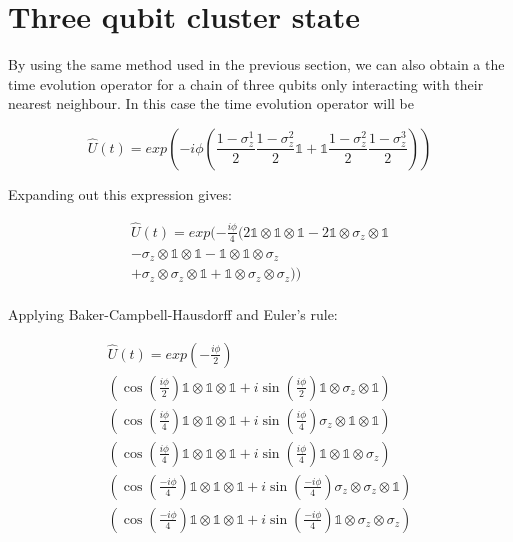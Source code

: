
\section{Three qubit cluster state}

By using the same method used in the previous section, we can also obtain a the time evolution operator for a chain of three qubits only interacting with their nearest neighbour. In this case the time evolution operator will be

\begin{equation}
\hat{U} (t) = exp\left(-i \phi \left( 
\frac{1 - \sigma^{1}_{z}}{2} \frac{1 - \sigma^{2}_{z}}{2}\mathbb{1}
+ \mathbb{1}\frac{1 - \sigma^{2}_{z}}{2} \frac{1 - \sigma^{3}_{z}}{2}
\right)\right)
\end{equation}

Expanding out this expression gives:

\begin{multline}
\hat{U} (t) = exp(-\frac{i \phi}{4}( 
2 \mathbb{1} \otimes \mathbb{1} \otimes \mathbb{1}
- 2 \mathbb{1} \otimes \sigma_{z} \otimes \mathbb{1} \\
- \sigma_{z} \otimes \mathbb{1} \otimes \mathbb{1}
- \mathbb{1} \otimes \mathbb{1} \otimes \sigma_{z} \\
+ \sigma_{z} \otimes \sigma_{z} \otimes \mathbb{1}
+ \mathbb{1} \otimes \sigma_{z} \otimes \sigma_{z} 
)) \\
\end{multline}

Applying Baker-Campbell-Hausdorff and Euler's rule:

\begin{multline*}
\hat{U} (t) = exp(-\frac{i \phi}{2}) \\
\left(\cos(\frac{i \phi}{2}) \mathbb{1} \otimes \mathbb{1} \otimes \mathbb{1}
+ i \sin (\frac{i \phi}{2}) \mathbb{1} \otimes \sigma_{z} \otimes \mathbb{1}\right) \\
\left(\cos(\frac{i \phi}{4}) \mathbb{1} \otimes \mathbb{1} \otimes \mathbb{1}
+ i \sin (\frac{i \phi}{4}) \sigma_{z} \otimes \mathbb{1} \otimes \mathbb{1}\right) \\
\left(\cos(\frac{i \phi}{4}) \mathbb{1} \otimes \mathbb{1} \otimes \mathbb{1}
+ i \sin (\frac{i \phi}{4}) \mathbb{1} \otimes \mathbb{1} \otimes \sigma_{z}\right) \\
\left(\cos(\frac{-i \phi}{4}) \mathbb{1} \otimes \mathbb{1} \otimes \mathbb{1}
+ i \sin (\frac{-i \phi}{4}) \sigma_{z} \otimes \sigma_{z} \otimes \mathbb{1}\right) \\
\left(\cos(\frac{-i \phi}{4}) \mathbb{1} \otimes \mathbb{1} \otimes \mathbb{1}
+ i \sin (\frac{-i \phi}{4}) \mathbb{1} \otimes \sigma_{z} \otimes \sigma_{z}\right) \\
\end{multline*}

